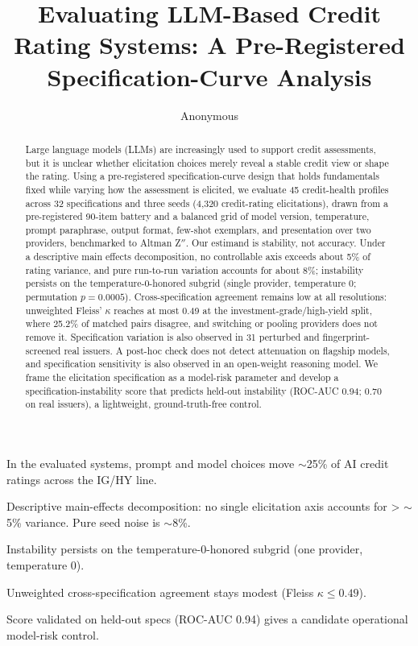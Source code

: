 \documentclass[a4paper,fleqn]{cas-sc}
\begin{document}
\RenewDocumentCommand{\printorcid}{}{} %
\let\WriteBookmarks\relax
\def\floatpagepagefraction{1}
\def\textpagefraction{.001}


\title[mode=title]{Evaluating LLM-Based Credit Rating Systems: A Pre-Registered Specification-Curve Analysis}

\author[1]{Anonymous}


\begin{abstract}
Large language models (LLMs) are increasingly used to support credit assessments, but it is unclear
whether elicitation choices merely reveal a stable credit view or shape the rating. Using a pre-registered
specification-curve design that holds fundamentals fixed while varying how the assessment is elicited, we
evaluate 45 credit-health profiles across 32 specifications and three seeds (4{,}320 credit-rating
elicitations), drawn from a pre-registered 90-item battery and a balanced grid of model version,
temperature, prompt paraphrase, output format, few-shot exemplars, and presentation over two providers,
benchmarked to Altman Z$''$. Our estimand is stability,
not accuracy. Under a descriptive main effects decomposition, no controllable axis exceeds about 5\% of
rating variance, and pure run-to-run variation accounts for about 8\%; instability persists on the
temperature-0-honored subgrid (single provider,
temperature 0; permutation $p=0.0005$). Cross-specification agreement remains low at all resolutions:
unweighted Fleiss' $\kappa$ reaches at most 0.49 at the investment-grade/high-yield split, where 25.2\% of
matched pairs disagree, and switching or pooling providers does not remove it. Specification variation is
also observed in 31 perturbed and fingerprint-screened real issuers. A post-hoc check does not detect attenuation on flagship
models, and specification sensitivity is also observed in an open-weight reasoning model. We frame the
elicitation specification as a
model-risk parameter and develop a specification-instability score that predicts held-out instability
(ROC-AUC 0.94; 0.70 on real issuers), a lightweight, ground-truth-free control.
\end{abstract}

\begin{highlights}
\item In the evaluated systems, prompt and model choices move $\sim$25\% of AI credit ratings across the IG/HY line.
\item Descriptive main-effects decomposition: no single elicitation axis accounts for > $\sim$5\% variance. Pure seed noise is $\sim$8\%.
\item Instability persists on the temperature-0-honored subgrid (one provider, temperature 0).
\item Unweighted cross-specification agreement stays modest (Fleiss $\kappa\le0.49$).
\item Score validated on held-out specs (ROC-AUC 0.94) gives a candidate operational model-risk control.
\end{highlights}
\end{document}
